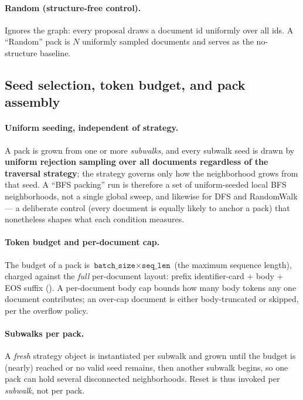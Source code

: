 \paragraph{Random (structure-free control).}
Ignores the graph: every proposal draws a document id uniformly over all ids. A
``Random'' pack is $N$ uniformly sampled documents and serves as the no-structure
baseline.

\subsection{Seed selection, token budget, and pack assembly}
\label{app:traversal:budget}

\paragraph{Uniform seeding, independent of strategy.}
A pack is grown from one or more \emph{subwalks}, and every subwalk seed is drawn by
\textbf{uniform rejection sampling over all documents regardless of the traversal
strategy}; the strategy governs only how the neighborhood grows from that seed. A
``BFS packing'' run is therefore a set of uniform-seeded local BFS neighborhoods, not a
single global sweep, and likewise for DFS and RandomWalk --- a deliberate control (every
document is equally likely to anchor a pack) that nonetheless shapes what each condition
measures.

\paragraph{Token budget and per-document cap.}
The budget of a pack is $\texttt{batch\_size}\times\texttt{seq\_len}$ (the maximum
sequence length), charged against the \emph{full} per-document layout: prefix
identifier-card $+$ body $+$ EOS suffix (). A per-document body cap
bounds how many body tokens any one document contributes; an over-cap document is either
body-truncated or skipped, per the overflow policy.

\paragraph{Subwalks per pack.}
A \emph{fresh} strategy object is instantiated per subwalk and grown until the budget is
(nearly) reached or no valid seed remains, then another subwalk begins, so one pack can
hold several disconnected neighborhoods. Reset is thus invoked per \emph{subwalk}, not
per pack.

